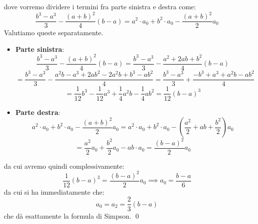 \documentclass[a4paper,11pt]{article}
\begin{document}
dove vorremo dividere i termini fra parte sinistra e destra come:
$$
\frac{b^3 - a^3}{3} - \frac{(a + b)^2}{4} (b - a) = a^2 \cdot a_0 + b^2 \cdot a_0 - \frac{(a + b)^2}{2} a_0 
$$
Valutiamo queste separatamente.
\begin{itemize}
	\item \textbf{Parte sinistra}:
		$$
		\frac{b^3 - a^3}{3} - \frac{(a + b)^2}{4} (b - a) = \frac{b^3 - a^3}{3} - \frac{a^2 + 2ab + b^2}{4} (b - a)
		$$
		$$
		= \frac{b^3 - a^3}{3} - \frac{a^2 b - a^3 + 2ab^2 - 2 a^2 b + b^3 - ab^2}{4} = \frac{b^3 - a^3}{3} + \frac{-b^3 + a^3 + a^2 b - a b^2}{4}
		$$
		$$
		= \frac{1}{12}b^3 - \frac{1}{12}a^3 + \frac{1}{4}a^2 b - \frac{1}{4} a b^2 = \frac{1}{12} (b - a)^3
		$$
		
	\item \textbf{Parte destra}:
		$$
		a^2 \cdot a_0 + b^2 \cdot a_0 - \frac{(a + b)^2}{2} a_0 = a^2 \cdot a_0 + b^2 \cdot a_0 - \left( \frac{a^2}{2} + ab + \frac{b^2}{2} \right) a_0
		$$
		$$
		= \frac{a^2}{2} a_0 + \frac{b^2}{2} a_0 - ab \cdot a_0 = \frac{(b - a)^2}{2} a_0
		$$
\end{itemize}
da cui avremo quindi complessivamente:
$$
\frac{1}{12} (b - a)^3 = \frac{(b - a)^2}{2} a_0 \implies a_0 = \frac{b - a}{6}
$$
da cui si ha immediatamente che:
$$
a_0 = a_2 = \frac{2}{3} (b - a)
$$
che dà esattamente la formula di Simpson. \qed

\par\smallskip
\end{document}
